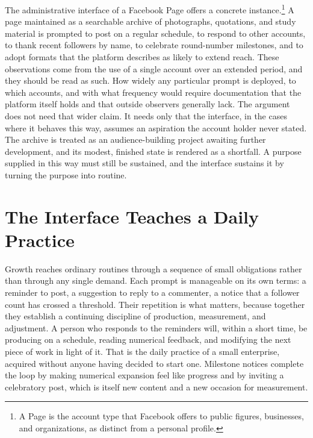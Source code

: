 \documentclass[12pt]{article}
\theoremstyle{plain}
\theoremstyle{definition}
\begin{document}
The administrative interface of a Facebook Page offers a concrete instance.\footnote{A Page is the account type that Facebook offers to public figures, businesses, and organizations, as distinct from a personal profile.} A page maintained as a searchable archive of photographs, quotations, and study material is prompted to post on a regular schedule, to respond to other accounts, to thank recent followers by name, to celebrate round-number milestones, and to adopt formats that the platform describes as likely to extend reach. These observations come from the use of a single account over an extended period, and they should be read as such. How widely any particular prompt is deployed, to which accounts, and with what frequency would require documentation that the platform itself holds and that outside observers generally lack. The argument does not need that wider claim. It needs only that the interface, in the cases where it behaves this way, assumes an aspiration the account holder never stated. The archive is treated as an audience-building project awaiting further development, and its modest, finished state is rendered as a shortfall. A purpose supplied in this way must still be sustained, and the interface sustains it by turning the purpose into routine.

\section{The Interface Teaches a Daily Practice}

Growth reaches ordinary routines through a sequence of small obligations rather than through any single demand. Each prompt is manageable on its own terms: a reminder to post, a suggestion to reply to a commenter, a notice that a follower count has crossed a threshold. Their repetition is what matters, because together they establish a continuing discipline of production, measurement, and adjustment. A person who responds to the reminders will, within a short time, be producing on a schedule, reading numerical feedback, and modifying the next piece of work in light of it. That is the daily practice of a small enterprise, acquired without anyone having decided to start one. Milestone notices complete the loop by making numerical expansion feel like progress and by inviting a celebratory post, which is itself new content and a new occasion for measurement.
\end{document}
